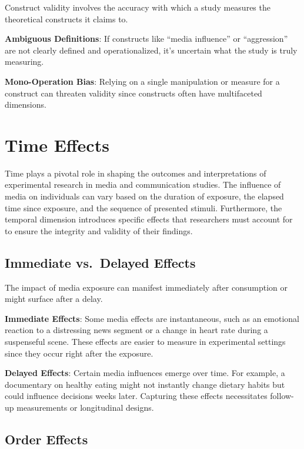 \documentclass[
  b5paper]{book}
\begin{document}
Construct validity involves the accuracy with which a study measures the theoretical constructs it claims to.

\textbf{Ambiguous Definitions}: If constructs like ``media influence'' or ``aggression'' are not clearly defined and operationalized, it's uncertain what the study is truly measuring.

\textbf{Mono-Operation Bias}: Relying on a single manipulation or measure for a construct can threaten validity since constructs often have multifaceted dimensions.

\hypertarget{time-effects}{%
\section{Time Effects}\label{time-effects}}

Time plays a pivotal role in shaping the outcomes and interpretations of experimental research in media and communication studies. The influence of media on individuals can vary based on the duration of exposure, the elapsed time since exposure, and the sequence of presented stimuli. Furthermore, the temporal dimension introduces specific effects that researchers must account for to ensure the integrity and validity of their findings.

\hypertarget{immediate-vs.-delayed-effects}{%
\subsection*{Immediate vs.~Delayed Effects}\label{immediate-vs.-delayed-effects}}

The impact of media exposure can manifest immediately after consumption or might surface after a delay.

\textbf{Immediate Effects}: Some media effects are instantaneous, such as an emotional reaction to a distressing news segment or a change in heart rate during a suspenseful scene. These effects are easier to measure in experimental settings since they occur right after the exposure.

\textbf{Delayed Effects}: Certain media influences emerge over time. For example, a documentary on healthy eating might not instantly change dietary habits but could influence decisions weeks later. Capturing these effects necessitates follow-up measurements or longitudinal designs.

\hypertarget{order-effects}{%
\subsection*{Order Effects}\label{order-effects}}
\end{document}
